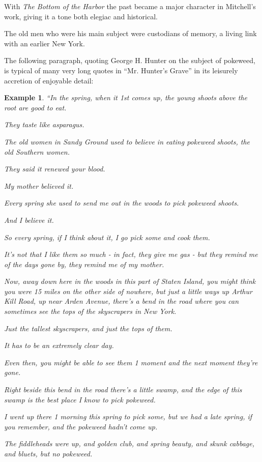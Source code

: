 \documentclass{book}
\numberwithin{equation}{section}
\newtheorem{example}{Example}[chapter]
\begin{document}
With \textit{The Bottom of the Harbor} the past became a major character in Mitchell's work, giving it a tone both elegiac and historical.

The old men who were his main subject were custodians of memory, a living link with an earlier New York.

%
The following paragraph, quoting George H. Hunter on the subject of pokeweed, is typical of many very long quotes in ``Mr. Hunter's Grave'' in its leisurely accretion of enjoyable detail:
\begin{example}
    ``In the spring, when it 1st comes up, the young shoots above the root are good to eat.
    
    They taste like asparagus.
    
    The old women in Sandy Ground used to believe in eating pokeweed shoots, the old Southern women.
    
    They said it renewed your blood.
    
    My mother believed it.
    
    Every spring she used to send me out in the woods to pick pokeweed shoots.
    
    And I believe it.
    
    So every spring, if I think about it, I go pick some and cook them.
    
    It's not that I like them so much - in fact, they give me gas - but they remind me of the days gone by, they remind me of my mother.
    
    Now, away down here in the woods in this part of Staten Island, you might think you were 15 miles on the other side of nowhere, but just a little ways up Arthur Kill Road, up near Arden Avenue, there's a bend in the road where you can sometimes see the tops of the skyscrapers in New York.
    
    Just the tallest skyscrapers, and just the tops of them.
    
    It has to be an extremely clear day.
    
    Even then, you might be able to see them 1 moment and the next moment they're gone.
    
    Right beside this bend in the road there's a little swamp, and the edge of this swamp is the best place I know to pick pokeweed.
    
    I went up there 1 morning this spring to pick some, but we had a late spring, if you remember, and the pokeweed hadn't come up.
    
    The fiddleheads were up, and golden club, and spring beauty, and skunk cabbage, and bluets, but no pokeweed.
    

\end{example}
\end{document}
